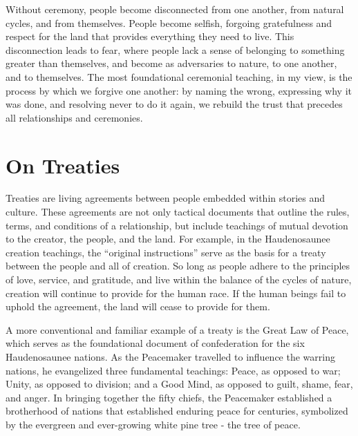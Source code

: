 \documentclass{report}
\begin{document}
\hspace{24pt} Without ceremony, people become disconnected from one another,  from natural cycles, and from themselves. People become selfish, forgoing gratefulness and respect for the land that provides everything they need to live. This disconnection leads to fear, where people lack a sense of belonging to something greater than themselves, and become as adversaries to nature, to one another, and to themselves. The most foundational ceremonial teaching, in my view, is the process by which we forgive one another: by naming the wrong, expressing why it was done, and resolving never to do it again, we rebuild the trust that precedes all relationships and ceremonies.

\section{On Treaties}

\hspace{24pt} Treaties are living agreements between people embedded within stories and culture. These agreements are not only tactical documents that outline the rules, terms, and conditions of a relationship, but include teachings of mutual devotion to the creator, the people, and the land. For example, in the Haudenosaunee creation teachings, the ``original instructions'' serve as the basis for a treaty between the people and all of creation. So long as people adhere to the principles of love, service, and gratitude, and live within the balance of the cycles of nature, creation will continue to provide for the human race. If the human beings fail to uphold the agreement, the land will cease to provide for them.


\hspace{24pt} A more conventional and familiar example of a treaty is the Great Law of Peace, which serves as the foundational document of confederation for the six Haudenosaunee nations. As the Peacemaker travelled to influence the warring nations, he evangelized three fundamental teachings: Peace, as opposed to war; Unity, as opposed to division; and a Good Mind, as opposed to guilt, shame, fear, and anger. In bringing together the fifty chiefs, the Peacemaker established a brotherhood of nations that established enduring peace for centuries, symbolized by the evergreen and ever-growing white pine tree - the tree of peace.
\end{document}
